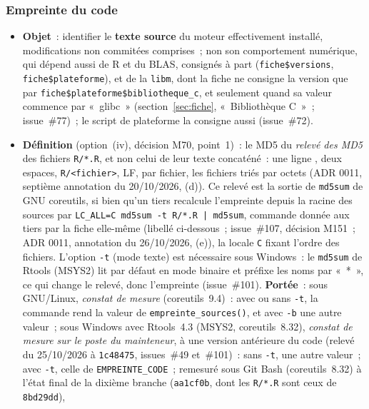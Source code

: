 \documentclass[a4paper,11pt]{article}
\newcommand{\code}[1]{\texttt{\small #1}}
\begin{document}
\subsubsection*{Empreinte du code}

\begin{itemize}[leftmargin=*, itemsep=2pt]
  \item \textbf{Objet}~: identifier le \textbf{texte source} du moteur
    effectivement installé, modifications non commitées comprises~; non son
    comportement numérique, qui dépend aussi de R et du BLAS, consignés à
    part (\code{fiche\$versions}, \code{fiche\$plateforme}), et de la
    \code{libm}, dont la fiche ne consigne la version que par
    \code{fiche\$plateforme\$bibliotheque\_c}, et seulement quand sa valeur
    commence par «~glibc~» (section~\ref{sec:fiche}, «~Bibliothèque C~»~;
    issue~\#77)~; le script de plateforme la consigne aussi (issue~\#72).
  \item \textbf{Définition} (option~(iv), décision M70, point~1)~: le MD5 du
    \emph{relevé des MD5} des fichiers \code{R/*.R}, et non celui de leur
    texte concaténé~: une ligne \code{<md5>}, deux espaces,
    \code{R/<fichier>}, LF, par fichier, les fichiers triés par octets
    (ADR 0011, septième annotation du 20/10/2026, (d)). Ce relevé est la
    sortie de \code{md5sum} de GNU coreutils, si bien qu'un tiers recalcule
    l'empreinte depuis la racine des sources par
    \code{LC\_ALL=C md5sum -t R/*.R | md5sum}, commande donnée aux tiers
    par la fiche elle-même (libellé ci-dessous~; issue~\#107, décision M151~;
    ADR 0011, annotation du 26/10/2026, (e)), la locale \code{C} fixant
    l'ordre des fichiers. L'option \code{-t} (mode texte) est
    nécessaire sous Windows~: le \code{md5sum} de Rtools (MSYS2) lit par
    défaut en mode binaire et préfixe les noms par «~*~», ce qui change le
    relevé, donc l'empreinte (issue~\#101). \textbf{Portée}~: sous GNU/Linux,
    \emph{constat de mesure} (coreutils~9.4)~: avec ou sans \code{-t}, la
    commande rend la valeur de \code{empreinte\_sources()}, et avec
    \code{-b} une autre valeur~; sous Windows avec Rtools~4.3
    (MSYS2, coreutils~8.32), \emph{constat de mesure sur le poste du
    mainteneur}, à une version antérieure du code (relevé du 25/10/2026 à
    \code{1c48475}, issues~\#49 et~\#101)~: sans \code{-t}, une autre
    valeur~; avec \code{-t}, celle de \code{EMPREINTE\_CODE}~; remesuré
    sous Git Bash (coreutils~8.32) à l'état final de la dixième branche
    (\code{aa1cf0b}, dont les \code{R/*.R} sont ceux de \code{8bd29dd}),

\end{itemize}
\end{document}
